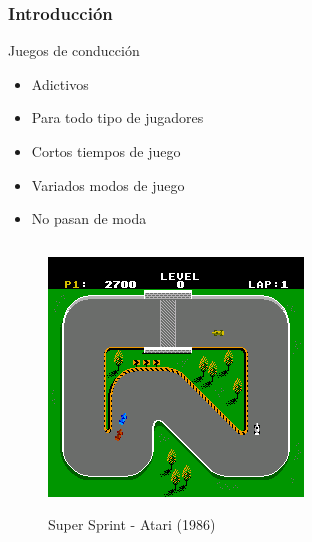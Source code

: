 \begin{frame}
    \frametitle{Introducción}

        \begin{block}{Juegos de conducción}
            \begin{itemize}
                \item Adictivos
                \item Para todo tipo de jugadores
                \item Cortos tiempos de juego
                \item Variados modos de juego
                \item No pasan de moda
            \end{itemize}
        \end{block}

    \begin{columns}
    
        \column{150px}

        \begin{figure}
          \label{logo_latex}
          \begin{center}
            \includegraphics[scale=0.4]{imagenes/super_sprint.png}
          \end{center}
          Super Sprint - Atari (1986)
        \end{figure}
    

\end{columns}
\end{frame}
